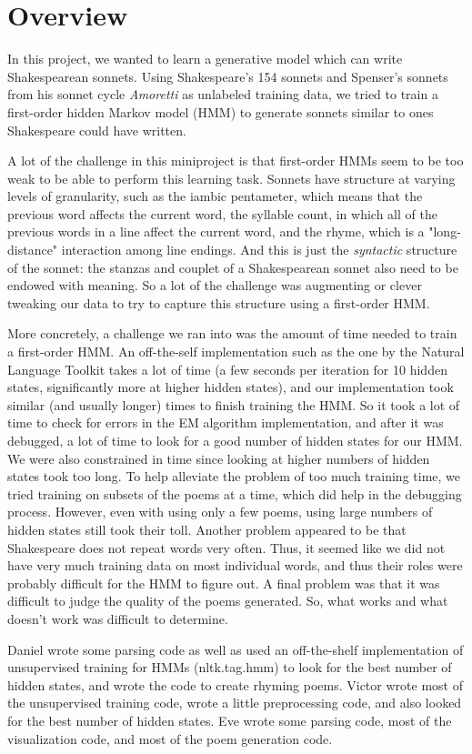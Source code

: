 \section{Overview}
In this project, we wanted to learn a generative model which can write Shakespearean sonnets. Using Shakespeare's 154 sonnets and Spenser's sonnets from his sonnet cycle \textit{Amoretti} as unlabeled training data, we tried to train a first-order hidden Markov model (HMM) to generate sonnets similar to ones Shakespeare could have written.
\par A lot of the challenge in this miniproject is that first-order HMMs seem to be too weak to be able to perform this learning task. Sonnets have structure at varying levels of granularity, such as the iambic pentameter, which means that the previous word affects the current word, the syllable count, in which all of the previous words in a line affect the current word, and the rhyme, which is a "long-distance" interaction among line endings. And this is just the \textit{syntactic} structure of the sonnet: the stanzas and couplet of a Shakespearean sonnet also need to be endowed with meaning. So a lot of the challenge was augmenting or clever tweaking our data to try to capture this structure using a first-order HMM.
\par More concretely, a challenge we ran into was the amount of time needed to train a first-order HMM. An off-the-self implementation such as the one by the Natural Language Toolkit takes a lot of time (a few seconds per iteration for 10 hidden states, significantly more at higher hidden states), and our implementation took similar (and usually longer) times to finish training the HMM. So it took a lot of time to check for errors in the EM algorithm implementation, and after it was debugged, a lot of time to look for a good number of hidden states for our HMM. We were also constrained in time since looking at higher numbers of hidden states took too long. To help alleviate the problem of too much training time, we tried training on subsets of the poems at a time, which did help in the debugging process. However, even with using only a few poems, using large numbers of hidden states still took their toll. Another problem appeared to be that Shakespeare does not repeat words very often. Thus, it seemed like we did not have very much training data on most individual words, and thus their roles were probably difficult for the HMM to figure out. A final problem was that it was difficult to judge the quality of the poems generated. So, what works and what doesn't work was difficult to determine.
\par Daniel wrote some parsing code as well as used an off-the-shelf implementation of unsupervised training for HMMs (nltk.tag.hmm) to look for the best number of hidden states, and wrote the code to create rhyming poems. Victor wrote most of the unsupervised training code, wrote a little preprocessing code, and also looked for the best number of hidden states. Eve wrote some parsing code, most of the visualization code, and most of the poem generation code. 


